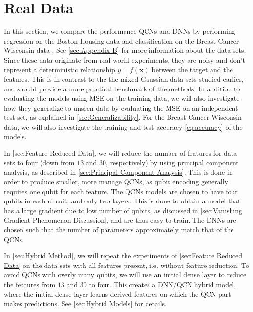 \section{Real Data}\label{sec:Real Data}
In this section, we compare the performance QCNs and DNNs by performing regression on the Boston Housing data \cite{boston} and classification on the Breast Cancer Wisconsin data \cite{cancer}. See \autoref{sec:Appendix B} for more information about the data sets. Since these data originate from real world experiments, they are noisy and don't represent a deterministic relationship $y = f(\boldsymbol{x})$ between the target and the features. This is in contrast to the the mixed Gaussian data sets studied earlier, and should provide a more practical benchmark of the methods. In addition to evaluating the models using MSE on the training data, we will also investigate how they generalize to unseen data by evaluating the MSE on an independent test set, as explained in \autoref{sec:Generalizability}. For the Breast Cancer Wisconsin data, we will also investigate the training and test accuracy \autoref{eq:accuracy} of the models.

In \autoref{sec:Feature Reduced Data}, we will reduce the number of features for data sets to four (down from $13$ and $30$, respectively) by using principal component analysis, as described in \autoref{sec:Principal Component Analysis}. This is done in order to produce smaller, more manage QCNs, as qubit encoding generally requires one qubit for each feature. The QCNs models are chosen to have four qubits in each circuit, and only two layers. This is done to obtain a model that has a large gradient due to low number of qubits, as discussed in \autoref{sec:Vanishing Gradient Phenomenon Discussion}, and are thus easy to train. The DNNs are chosen such that the number of parameters approximately match that of the QCNs. 

In \autoref{sec:Hybrid Method}, we will repeat the experiments of \autoref{sec:Feature Reduced Data} on the data sets with all features present, i.e. without feature reduction. To avoid QCNs with overly many qubits, we will use an initial dense layer to reduce the features from $13$ and $30$ to four. This creates a DNN/QCN hybrid model, where the initial dense layer learns derived features on which the QCN part makes predictions. See \autoref{sec:Hybrid Models} for details. 

